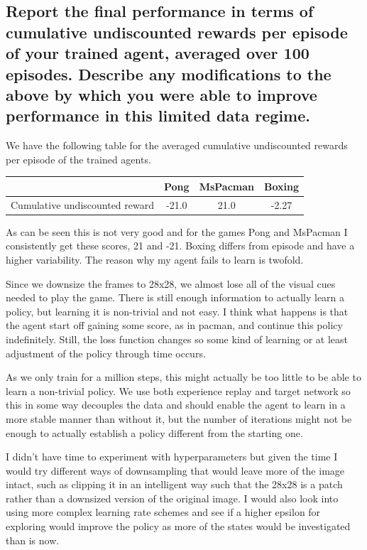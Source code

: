\documentclass{article}
\begin{document}
\subsection{Report the final performance in terms of cumulative undiscounted
  rewards per episode of your trained agent, averaged over 100 episodes.
  Describe any modifications to the above by which you were able to improve
  performance in this limited data regime.}

We have the following table for the averaged cumulative undiscounted rewards per
episode of the trained agents.

\begin{center}
  \begin{tabular}{ |c|c|c|c| } 
    \hline
     & Pong & MsPacman & Boxing \\
    \hline
    Cumulative undiscounted reward & -21.0 & 21.0 & -2.27 \\
    \hline
  \end{tabular}
\end{center}

As can be seen this is not very good and for the games Pong and MsPacman I
consistently get these scores, 21 and -21. Boxing differs from episode and have
a higher variability. The reason why my agent fails to learn is twofold.

Since we downsize the frames to 28x28, we almost lose all of the visual cues
needed to play the game. There is still enough information to actually learn a
policy, but learning it is non-trivial and not easy. I think what happens is
that the agent start off gaining some score, as in pacman, and continue this
policy indefinitely. Still, the loss function changes so some kind of learning
or at least adjustment of the policy through time occurs.

As we only train for a million steps, this might actually be too little to be
able to learn a non-trivial policy. We use both experience replay and target
network so this in some way decouples the data and should enable the agent to
learn in a more stable manner than without it, but the number of iterations
might not be enough to actually establish a policy different from the starting
one.

I didn't have time to experiment with hyperparameters but given the time I would
try different ways of downsampling that would leave more of the image intact,
such as clipping it in an intelligent way such that the 28x28 is a patch rather
than a downsized version of the original image. I would also look into using
more complex learning rate schemes and see if a higher epsilon for exploring would
improve the policy as more of the states would be investigated than is now.

\appendix
\end{document}
